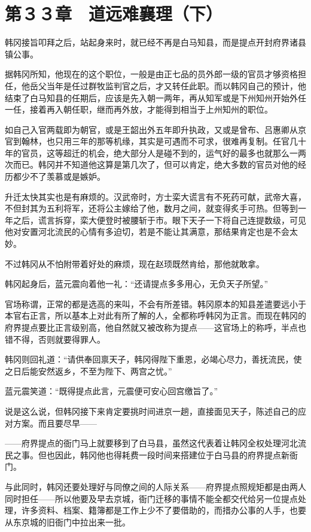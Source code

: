 \section{第３３章　道远难襄理（下）}

韩冈接旨叩拜之后，站起身来时，就已经不再是白马知县，而是提点开封府界诸县镇公事。

据韩冈所知，他现在的这个职位，一般是由正七品的员外郎一级的官员才够资格担任，他岳父当年是任过群牧监判官之后，才又转任此职。而以韩冈自己的预计，他结束了白马知县的任期后，应该是先入朝一两年，再从知军或是下州知州开始外任一任，接着再入朝任职，继而再外放，才能得到相当于上州知州的职位。

如自己入官两载即为朝官，或是王韶出外五年即升执政，又或是曾布、吕惠卿从京官到翰林，也只用三年的那等机缘，其实是可遇而不可求，很难再复制。任官几十年的官员，这等超迁的机会，绝大部分人是碰不到的，运气好的最多也就那么一两次而已。韩冈并不知道他这算是第几次了，但可以肯定，绝大多数的官员对他的经历都少不了羡慕或是嫉妒。

升迁太快其实也是有麻烦的。汉武帝时，方士栾大谎言有不死药可献，武帝大喜，不但封其为五利将军，还将公主嫁给了他，数月之间，就变得炙手可热。但等到一年之后，谎言拆穿，栾大便登时被腰斩于市。眼下天子一下将自己连提数级，可见他对安置河北流民的心情有多迫切，若是不能让其满意，那结果肯定也是不会太妙。

不过韩冈从不怕附带着好处的麻烦，现在赵顼既然肯给，那他就敢拿。

韩冈起身后，蓝元震向着他一礼：“还请提点多多用心，无负天子所望。”

官场称谓，正常的都是选高的来叫，不会有所差错。韩冈原本的知县差遣要远小于本官右正言，所以基本上对此有所了解的人，全都称呼韩冈为正言。而现在韩冈的府界提点要比正言级别高，他自然就又被改称为提点——这官场上的称呼，半点也错不得，否则就要得罪人。

韩冈则回礼道：“请供奉回禀天子，韩冈得陛下重恩，必竭心尽力，善抚流民，使之日后能安然返乡，不至为陛下、两宫之忧。”

蓝元震笑道：“既得提点此言，元震便可安心回宫缴旨了。”

说是这么说，但韩冈接下来肯定要挑时间进京一趟，直接面见天子，陈述自己的应对方案。而且要尽早——

——府界提点的衙门马上就要移到了白马县，虽然这代表着让韩冈全权处理河北流民之事。但也因此，韩冈他也得耗费一段时间来搭建位于白马县的府界提点新衙门。

与此同时，韩冈还要处理好与同僚之间的人际关系——府界提点照规矩都是由两人同时担任——所以他要及早去京城，衙门迁移的事情不能全都交代给另一位提点处理，许多资料、档案、籍簿都是工作上少不了要借助的，而措办公事的人手，也要从东京城的旧衙门中拉出来一批。

